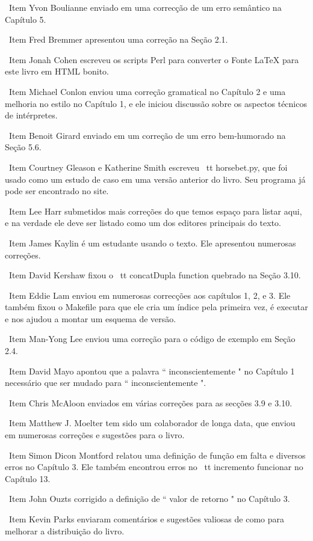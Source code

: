 \documentclass[10pt]{book}
\begin{document}
\ Item Yvon Boulianne enviado em uma correcção de um erro semântico na
Capítulo 5.

\ Item Fred Bremmer apresentou uma correção na Seção 2.1.

\ Item Jonah Cohen escreveu os scripts Perl para converter o
Fonte LaTeX para este livro em HTML bonito.

\ Item Michael Conlon enviou uma correção gramatical no Capítulo 2
e uma melhoria no estilo no Capítulo 1, e ele iniciou discussão
sobre os aspectos técnicos de intérpretes.

\ Item Benoit Girard enviado em um
correção de um erro bem-humorado na Seção 5.6.

\ Item Courtney Gleason e Katherine Smith escreveu {\ tt horsebet.py},
que foi usado como um estudo de caso em uma versão anterior do livro. Seu
programa já pode ser encontrado no site.

\ Item Lee Harr submetidos mais correções do que temos espaço para listar
aqui, e na verdade ele deve ser listado como um dos editores principais
do texto.

\ Item James Kaylin é um estudante usando o texto. Ele apresentou
numerosas correções.

\ Item David Kershaw fixou o {\ tt concatDupla} function quebrado na Seção
3.10.

\ Item Eddie Lam enviou em numerosas correcções aos capítulos 
1, 2, e 3.
Ele também fixou o Makefile para que ele cria um índice pela primeira vez, é
executar e nos ajudou a montar um esquema de versão.  

\ Item Man-Yong Lee enviou uma correção para o código de exemplo em
Seção 2.4.  

\ Item David Mayo apontou que a palavra `` inconscientemente "
no Capítulo 1 necessário
que ser mudado para `` inconscientemente ".

\ Item Chris McAloon enviados em várias correções para as secções 3.9 e
3.10.

\ Item Matthew J. Moelter tem sido um colaborador de longa data, que enviou
em numerosas correções e sugestões para o livro.  

\ Item Simon Dicon Montford relatou uma definição de função em falta e
diversos erros no Capítulo 3. Ele também encontrou erros no {\ tt incremento}
funcionar no Capítulo 13.

\ Item John Ouzts corrigido a definição de `` valor de retorno "
no Capítulo 3.

\ Item Kevin Parks enviaram comentários e sugestões valiosas de como
para melhorar a distribuição do livro.
\end{document}
